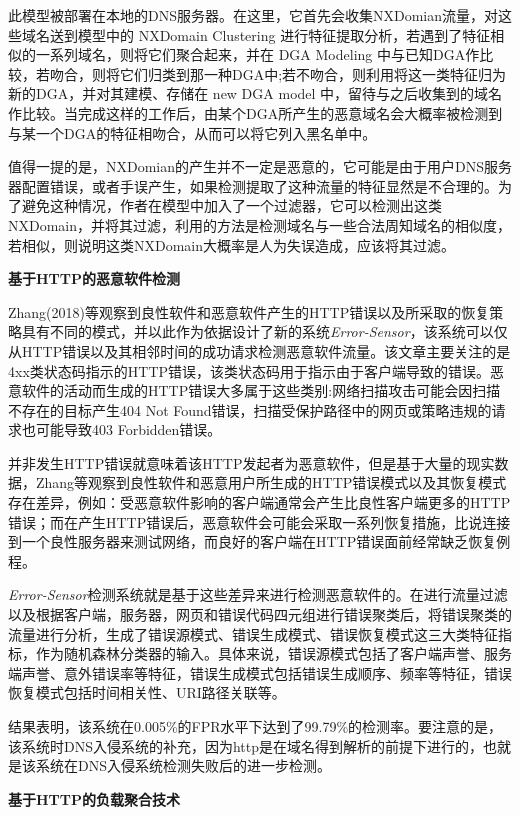 \documentclass[12pt]{article} %
\begin{document}
此模型被部署在本地的DNS服务器。在这里，它首先会收集NXDomian流量，对这些域名送到模型中的 NXDomain Clustering 进行特征提取分析，若遇到了特征相似的一系列域名，则将它们聚合起来，并在 DGA Modeling 中与已知DGA作比较，若吻合，则将它们归类到那一种DGA中;若不吻合，则利用将这一类特征归为新的DGA，并对其建模、存储在 new DGA model 中，留待与之后收集到的域名作比较。当完成这样的工作后，由某个DGA所产生的恶意域名会大概率被检测到与某一个DGA的特征相吻合，从而可以将它列入黑名单中。

值得一提的是，NXDomian的产生并不一定是恶意的，它可能是由于用户DNS服务器配置错误，或者手误产生，如果检测提取了这种流量的特征显然是不合理的。为了避免这种情况，作者在模型中加入了一个过滤器，它可以检测出这类NXDomain，并将其过滤，利用的方法是检测域名与一些合法周知域名的相似度，若相似，则说明这类NXDomain大概率是人为失误造成，应该将其过滤。

\textbf{基于HTTP的恶意软件检测}

Zhang(2018)\cite{Zhang}等观察到良性软件和恶意软件产生的HTTP错误以及所采取的恢复策略具有不同的模式，并以此作为依据设计了新的系统\emph{Error-Sensor}，该系统可以仅从HTTP错误以及其相邻时间的成功请求检测恶意软件流量。该文章主要关注的是4xx类状态码指示的HTTP错误，该类状态码用于指示由于客户端导致的错误。恶意软件的活动而生成的HTTP错误大多属于这些类别:网络扫描攻击可能会因扫描不存在的目标产生404 Not Found错误，扫描受保护路径中的网页或策略违规的请求也可能导致403 Forbidden错误。

并非发生HTTP错误就意味着该HTTP发起者为恶意软件，但是基于大量的现实数据，Zhang等观察到良性软件和恶意用户所生成的HTTP错误模式以及其恢复模式存在差异，例如：受恶意软件影响的客户端通常会产生比良性客户端更多的HTTP错误；而在产生HTTP错误后，恶意软件会可能会采取一系列恢复措施，比说连接到一个良性服务器来测试网络，而良好的客户端在HTTP错误面前经常缺乏恢复例程。

\emph{Error-Sensor}检测系统就是基于这些差异来进行检测恶意软件的。在进行流量过滤以及根据客户端，服务器，网页和错误代码四元组进行错误聚类后，将错误聚类的流量进行分析，生成了错误源模式、错误生成模式、错误恢复模式这三大类特征指标，作为随机森林分类器的输入。具体来说，错误源模式包括了客户端声誉、服务端声誉、意外错误率等特征，错误生成模式包括错误生成顺序、频率等特征，错误恢复模式包括时间相关性、URI路径关联等。

结果表明，该系统在0.005\%的FPR水平下达到了99.79\%的检测率。要注意的是，该系统时DNS入侵系统的补充，因为http是在域名得到解析的前提下进行的，也就是该系统在DNS入侵系统检测失败后的进一步检测。

\textbf{基于HTTP的负载聚合技术}
\end{document}
